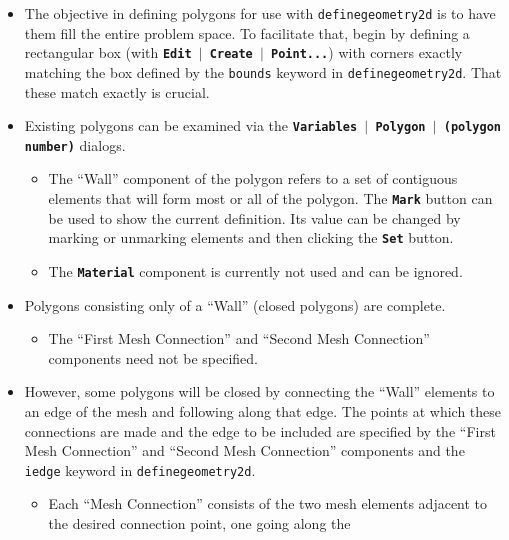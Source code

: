 \documentclass[12pt]{report}
\begin{document}
\begin{enumerate}
\begin{itemize}
    \item The objective in defining polygons for use with 
{\tt definegeometry2d} is to have them fill the entire problem space.  
To facilitate that, begin by defining a rectangular box
(with \textbf{\texttt{Edit \begin{math}\vert{}\end{math} Create \begin{math}\vert{}\end{math} Point...}}) with
corners exactly matching the box defined by the \verb+bounds+ keyword
in {\tt definegeometry2d}.  That these match exactly is crucial.
    \item Existing polygons can be examined via the 
\textbf{\texttt{Variables \begin{math}\vert{}\end{math} Polygon \begin{math}\vert{}\end{math} (polygon number)}} dialogs. 
    \begin{itemize}
      \item The ``Wall'' component of the polygon 
refers to a set of contiguous elements that will form most or 
all of the polygon.  The \textbf{\texttt{Mark}} 
button can be used to show the current definition.  Its value can 
be changed by marking or unmarking elements and then clicking the 
\textbf{\texttt{Set}} button.
      \item The \textbf{\texttt{Material}} 
component is currently not used and can be ignored.
    \end{itemize}
    \item Polygons consisting only of a ``Wall'' (closed polygons) 
are complete.
    \begin{itemize}
      \item The ``First Mesh Connection'' and ``Second Mesh Connection'' 
components need not be specified.
    \end{itemize}
    \item However, some polygons will be closed by connecting the 
``Wall'' elements to an edge of the mesh and following along that edge.  
The points at which these connections are made and the edge to be included are
specified by the ``First Mesh Connection'' and ``Second Mesh Connection'' 
components and the \verb+iedge+ keyword in {\tt definegeometry2d}.
    \begin{itemize}
      \item Each ``Mesh Connection'' consists of the two mesh elements 
adjacent to the desired connection point, one going along the

\end{itemize}
\end{itemize}
\end{enumerate}
\end{document}
